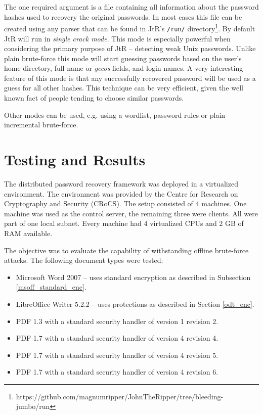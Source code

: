 \documentclass[11pt,oneside]{fithesis2}
\begin{document}
The one required argument is a file containing all information about the password hashes used to recovery the original passwords. In most cases this file can be created using any parser that can be found in JtR's \texttt{/run/} directory\footnote{https://github.com/magnumripper/JohnTheRipper/tree/bleeding-jumbo/run}. By default JtR will run in \textit{single crack mode}. This mode is especially powerful when considering the primary purpose of JtR -- detecting weak Unix passwords. Unlike plain brute-force this mode will start guessing passwords based on the user's home directory, full name or \textit{gecos} fields, and login names. A very interesting feature of this mode is that any successfully recovered password will be used as a guess for all other hashes. This technique can be very efficient, given the well known fact of  people tending to choose similar passwords.

Other modes can be used, e.g. using a wordlist, password rules or plain incremental brute-force. 
  
\section{Testing and Results}

The distributed password recovery framework was deployed in a virtualized environment. The environment was provided by the Centre for Research on Cryptography and Security (CRoCS). The setup consisted of 4 machines. One machine was used as the control server, the remaining three were clients. All were part of one local subnet. Every machine had 4 virtualized CPUs and 2 GB of RAM available. 

The objective was to evaluate the capability of withstanding offline brute-force attacks. The following document types were tested:

\begin{itemize}
\setlength\itemsep{0.1em}
	\item{Microsoft Word 2007 -- uses standard encryption as described in Subsection \ref{msoff_standard_enc}.}
	\item{LibreOffice Writer 5.2.2 -- uses protections as described in Section \ref{odt_enc}.}
	\item{PDF 1.3 with a standard security handler of version 1 revision 2.}
	\item{PDF 1.7 with a standard security handler of version 4 revision 4.}	
	\item{PDF 1.7 with a standard security handler of version 4 revision 5.}	
	\item{PDF 1.7 with a standard security handler of version 4 revision 6.}	
\end{itemize}
\end{document}
